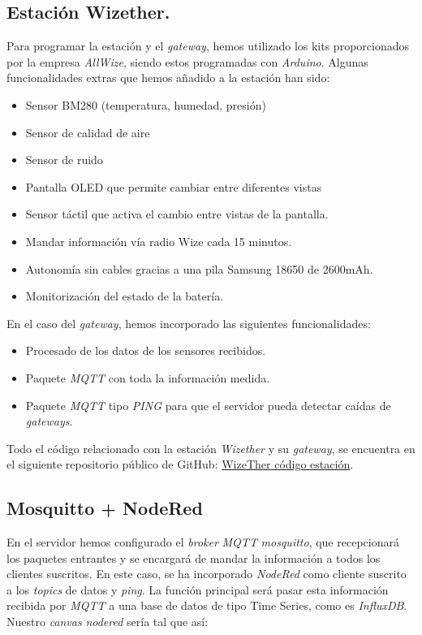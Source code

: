 \documentclass[12pt]{article}
\begin{document}
\subsection{Estación Wizether.}
Para programar la estación y el \textit{gateway}, hemos utilizado los kits proporcionados por la empresa \textit{AllWize}, siendo estos programadas con \textit{Arduino}. Algunas funcionalidades extras que hemos añadido a la estación han sido:
\begin{itemize}
	\item Sensor BM280 (temperatura, humedad, presión)
	\item Sensor de calidad de aire
	\item Sensor de ruido
	\item Pantalla OLED que permite cambiar entre diferentes vistas
	\item Sensor táctil que activa el cambio entre vistas de la pantalla.
	\item Mandar información vía radio Wize cada 15 minutos.
	\item Autonomía sin cables gracias a una pila Samsung 18650 de 2600mAh.
	\item Monitorización del estado de la batería.
\end{itemize}

\noindent En el caso del \textit{gateway}, hemos incorporado las siguientes funcionalidades:
\begin{itemize}
	\item Procesado de los datos de los sensores recibidos.
	\item Paquete \textit{MQTT} con toda la información medida.
	\item Paquete \textit{MQTT} tipo \textit{PING} para que el servidor pueda detectar caídas de \textit{gateways}.
\end{itemize}

\noindent Todo el código relacionado con la estación \textit{Wizether} y su \textit{gateway}, se encuentra en el siguiente repositorio público de GitHub: \href{https://github.com/Raniita/wizether_resources/tree/master/WizeTher_code}{WizeTher código estación}.

\pagebreak

\subsection{Mosquitto + NodeRed}
En el servidor hemos configurado el \textit{broker} \textit{MQTT} \textit{mosquitto}, que recepcionará los paquetes entrantes y se encargará de mandar la información a todos los clientes suscritos. En este caso, se ha incorporado \textit{NodeRed} como cliente suscrito a los \textit{topics} de datos y \textit{ping}. La función principal será pasar esta información recibida por \textit{MQTT} a una base de datos de tipo Time Series, como es \textit{InfluxDB}. Nuestro \textit{canvas} \textit{nodered} sería tal que así:
\end{document}
